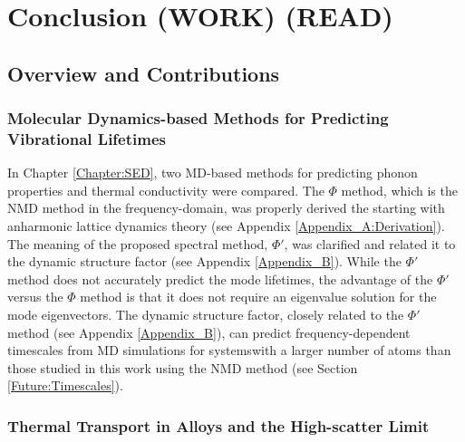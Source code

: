 \chapter{\label{Conclusion}Conclusion (WORK) (READ)}

\section{\label{Overview}Overview and Contributions}

\subsection{\label{Overview:SED} 
Molecular Dynamics-based Methods for Predicting Vibrational 
Lifetimes}

In Chapter \ref{Chapter:SED}, two MD-based methods for predicting 
phonon properties and thermal conductivity were compared. 
The $\Phi$ method, which is the NMD method in the frequency-domain, 
was properly derived the starting with anharmonic lattice 
dynamics theory (see Appendix \ref{Appendix_A:Derivation}). 
The meaning of the proposed spectral method, $\Phi'$, 
was clarified and related it to the dynamic structure factor 
(see Appendix \ref{Appendix_B}). 
While 
the $\Phi'$ method does not accurately predict the mode lifetimes, 
the advantage of the $\Phi'$ versus the $\Phi$ method is that it does 
not require an eigenvalue solution for the mode eigenvectors.  
The dynamic structure factor, closely related to the $\Phi'$ method 
(see Appendix \ref{Appendix_B}), can predict frequency-dependent 
timescales from MD simulations for systemswith a larger number of 
atoms than those studied in this work using the NMD method 
(see Section \ref{Future:Timescales}). 

\subsection{\label{Overview:VC}
Thermal Transport in Alloys and the High-scatter Limit}

